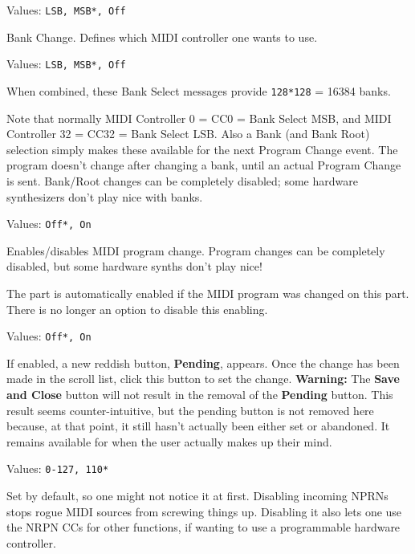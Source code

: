    Values: \texttt{LSB, MSB*, Off}

   Bank Change.
   Defines which MIDI controller one wants to use.

   Values: \texttt{LSB, MSB*, Off}

   When combined, these Bank Select messages provide
   \texttt{128*128} = 16384 banks.

   Note that normally MIDI Controller 0 = CC0 = Bank Select MSB, and MIDI
   Controller 32 = CC32 = Bank Select LSB. Also a Bank (and Bank Root)
   selection simply makes these available for the next Program Change event.
   The program doesn't change after changing a bank, until an actual Program
   Change is sent.
   Bank/Root changes can be completely disabled; some hardware synthesizers
   don't play nice with banks.


   Values: \texttt{Off*, On}

   Enables/disables MIDI program change.
   Program changes can be completely disabled, but some hardware synths don't
   play nice!


   The part is automatically enabled if the MIDI program was changed on this
   part.  There is no longer an option to disable this enabling.


   Values: \texttt{Off*, On}

   If enabled, a new reddish button, \textbf{Pending}, appears.
   Once the change has been made in the scroll list, click this button
   to set the change.
   \textbf{Warning:}
   The \textbf{Save and Close} button will not result in the removal of the
   \textbf{Pending} button.
   This result seems counter-intuitive, but the pending button is not removed
   here because, at that point, it still hasn't actually been either set or
   abandoned. It remains available for when the user actually makes up their
   mind.

   Values: \texttt{0-127, 110*}

   Set by default, so one might not notice it at first.
   Disabling incoming NPRNs stops rogue MIDI sources from screwing things up.
   Disabling it also lets one use the NRPN CCs for other functions,
   if wanting to use a programmable hardware controller.

